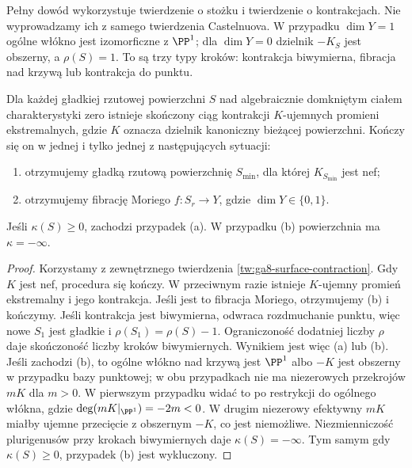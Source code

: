 \begin{uwaga}
Pełny dowód wykorzystuje twierdzenie o stożku i twierdzenie
o kontrakcjach. Nie wyprowadzamy ich z samego twierdzenia
Castelnuova. W przypadku $\dim Y=1$ ogólne włókno
jest izomorficzne z $\PP^1$; dla $\dim Y=0$ dzielnik
$-K_S$ jest obszerny, a $\rho(S)=1$.
To są trzy typy kroków: kontrakcja biwymierna,
fibracja nad krzywą lub kontrakcja do punktu.
\end{uwaga}

\begin{twierdzenie}
\label{tw:ga8-surface-mmp}
Dla każdej gładkiej rzutowej powierzchni $S$
nad algebraicznie domkniętym ciałem charakterystyki zero
istnieje skończony ciąg kontrakcji $K$-ujemnych
promieni ekstremalnych, gdzie $K$ oznacza dzielnik
kanoniczny bieżącej powierzchni. Kończy się on w jednej
i tylko jednej z następujących sytuacji:
\begin{enumerate}[label=(\alph*)]
\item otrzymujemy gładką rzutową powierzchnię $S_{\min}$,
dla której $K_{S_{\min}}$ jest nef;
\item otrzymujemy fibrację Moriego $f:S_r\to Y$,
gdzie $\dim Y\in\{0,1\}$.
\end{enumerate}
Jeśli $\kappa(S)\ge0$, zachodzi przypadek (a).
W przypadku (b) powierzchnia ma $\kappa=-\infty$.
\end{twierdzenie}
\begin{proof}
Korzystamy z zewnętrznego twierdzenia
\ref{tw:ga8-surface-contraction}. Gdy $K$ jest nef,
procedura się kończy. W przeciwnym razie istnieje
$K$-ujemny promień ekstremalny i jego kontrakcja.
Jeśli jest to fibracja Moriego, otrzymujemy (b)
i kończymy. Jeśli kontrakcja jest biwymierna,
odwraca rozdmuchanie punktu, więc nowe $S_1$
jest gładkie i $\rho(S_1)=\rho(S)-1$.
Ograniczoność dodatniej liczby $\rho$ daje skończoność
liczby kroków biwymiernych. Wynikiem jest więc
(a) lub (b). Jeśli zachodzi (b), to ogólne włókno
nad krzywą jest $\PP^1$ albo $-K$ jest obszerny
w przypadku bazy punktowej; w obu przypadkach
nie ma niezerowych przekrojów $mK$ dla $m>0$.
W pierwszym przypadku widać to po restrykcji
do ogólnego włókna, gdzie
$\deg(mK|_{\PP^1})=-2m<0$.
W drugim niezerowy efektywny $mK$ miałby
ujemne przecięcie z obszernym $-K$, co jest
niemożliwe. Niezmienniczość plurigenusów przy
krokach biwymiernych daje $\kappa(S)=-\infty$.
Tym samym gdy $\kappa(S)\ge0$, przypadek (b)
jest wykluczony.
\end{proof}

